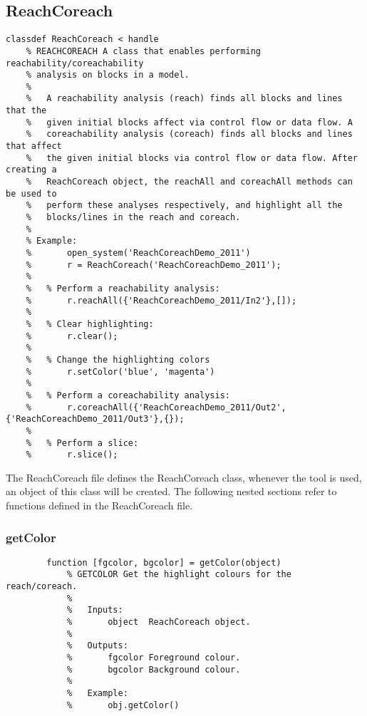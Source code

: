 \documentclass[12pt,letterpaper]{report}
\begin{document}
	\subsection{ReachCoreach}
\begin{lstlisting}
classdef ReachCoreach < handle
    % REACHCOREACH A class that enables performing reachability/coreachability
    % analysis on blocks in a model.
    %
    %   A reachability analysis (reach) finds all blocks and lines that the
    %   given initial blocks affect via control flow or data flow. A
    %   coreachability analysis (coreach) finds all blocks and lines that affect
    %   the given initial blocks via control flow or data flow. After creating a
    %   ReachCoreach object, the reachAll and coreachAll methods can be used to
    %   perform these analyses respectively, and highlight all the
    %   blocks/lines in the reach and coreach.
    %
    % Example:
    %       open_system('ReachCoreachDemo_2011')
    %       r = ReachCoreach('ReachCoreachDemo_2011');
    %
    %   % Perform a reachability analysis:
    %       r.reachAll({'ReachCoreachDemo_2011/In2'},[]);
    %
    %   % Clear highlighting:
    %       r.clear();
    %
    %   % Change the highlighting colors
    %       r.setColor('blue', 'magenta')
    %
    %   % Perform a coreachability analysis:
    %       r.coreachAll({'ReachCoreachDemo_2011/Out2', {'ReachCoreachDemo_2011/Out3'},{});
    %
    %   % Perform a slice:
    %       r.slice();
\end{lstlisting}
	The ReachCoreach file defines the ReachCoreach class, whenever the tool is used, an object of this class will be created.
	The following nested sections refer to functions defined in the ReachCoreach file.
		
		\subsubsection{getColor}
\begin{lstlisting}
        function [fgcolor, bgcolor] = getColor(object)
            % GETCOLOR Get the highlight colours for the reach/coreach.
            %
            %   Inputs:
            %       object  ReachCoreach object.
            %
            %   Outputs:
            %       fgcolor Foreground colour.
            %       bgcolor Background colour.
            %
            %   Example:
            %       obj.getColor()
\end{lstlisting}
		
\end{document}

